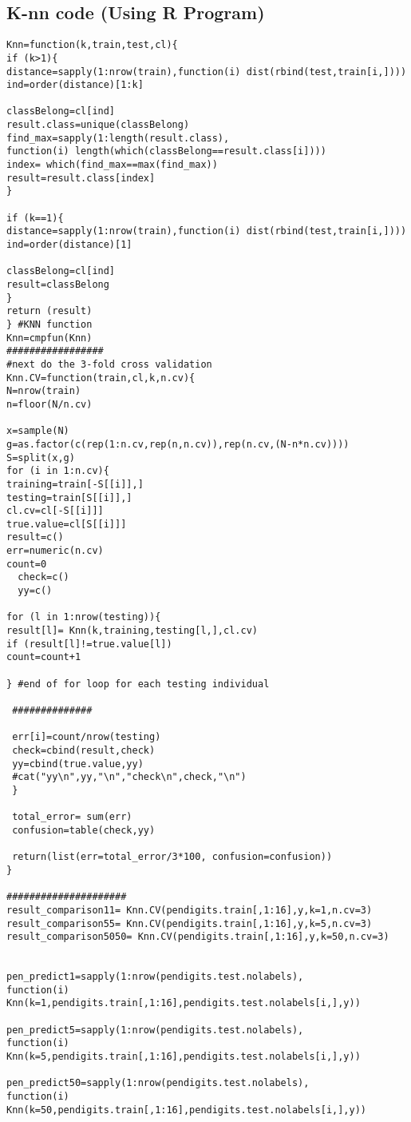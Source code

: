 \documentclass{article}
\begin{document}
\subsection{K-nn code (Using R Program)}
\begin{verbatim}
Knn=function(k,train,test,cl){
if (k>1){
distance=sapply(1:nrow(train),function(i) dist(rbind(test,train[i,])))
ind=order(distance)[1:k]

classBelong=cl[ind]
result.class=unique(classBelong)
find_max=sapply(1:length(result.class),
function(i) length(which(classBelong==result.class[i])))
index= which(find_max==max(find_max))
result=result.class[index]
}

if (k==1){
distance=sapply(1:nrow(train),function(i) dist(rbind(test,train[i,])))
ind=order(distance)[1]

classBelong=cl[ind]
result=classBelong
}
return (result)
} #KNN function
Knn=cmpfun(Knn)
#################
#next do the 3-fold cross validation 
Knn.CV=function(train,cl,k,n.cv){
N=nrow(train)
n=floor(N/n.cv)

x=sample(N)
g=as.factor(c(rep(1:n.cv,rep(n,n.cv)),rep(n.cv,(N-n*n.cv))))
S=split(x,g)
for (i in 1:n.cv){
training=train[-S[[i]],]
testing=train[S[[i]],]
cl.cv=cl[-S[[i]]]
true.value=cl[S[[i]]]
result=c()
err=numeric(n.cv)
count=0
  check=c()
  yy=c()

for (l in 1:nrow(testing)){
result[l]= Knn(k,training,testing[l,],cl.cv)
if (result[l]!=true.value[l])
count=count+1

} #end of for loop for each testing individual

 ##############
 
 err[i]=count/nrow(testing)
 check=cbind(result,check)
 yy=cbind(true.value,yy)
 #cat("yy\n",yy,"\n","check\n",check,"\n")
 }
 
 total_error= sum(err)
 confusion=table(check,yy)
 
 return(list(err=total_error/3*100, confusion=confusion))
}

#####################
result_comparison11= Knn.CV(pendigits.train[,1:16],y,k=1,n.cv=3)
result_comparison55= Knn.CV(pendigits.train[,1:16],y,k=5,n.cv=3)
result_comparison5050= Knn.CV(pendigits.train[,1:16],y,k=50,n.cv=3)


pen_predict1=sapply(1:nrow(pendigits.test.nolabels),
function(i) Knn(k=1,pendigits.train[,1:16],pendigits.test.nolabels[i,],y))

pen_predict5=sapply(1:nrow(pendigits.test.nolabels),
function(i) Knn(k=5,pendigits.train[,1:16],pendigits.test.nolabels[i,],y))

pen_predict50=sapply(1:nrow(pendigits.test.nolabels),
function(i) Knn(k=50,pendigits.train[,1:16],pendigits.test.nolabels[i,],y))



\end{verbatim}
\end{document}

